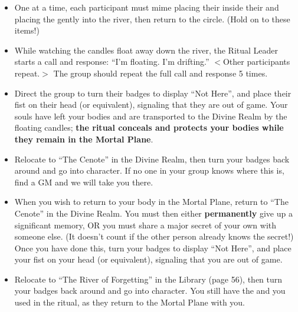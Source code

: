 \documentclass[green]{GL2020}
\begin{document}
\begin{enumerate}
\begin{itemize}
        \item One at a time, each participant must mime placing their \iRitualCandle{} inside their \iGlassVial{} and placing the \iGlassVial{} gently into the river, then return to the circle. (Hold on to these items!)
        \item While watching the candles float away down the river, the Ritual Leader starts a call and response: ``I'm floating. I'm drifting.'' $<$Other participants repeat.$>$ The group should repeat the full call and response 5 times.
        \item Direct the group to turn their badges to display ``Not Here'', and place their fist on their head (or equivalent), signaling that they are out of game. Your souls have left your bodies and are transported to the Divine Realm by the floating candles; \textbf{the ritual conceals and protects your bodies while they remain in the Mortal Plane}.
        \item Relocate to ``The Cenote'' in the Divine Realm, then turn your badges back around and go into character. If no one in your group knows where this is, find a GM and we will take you there.
        \item When you wish to return to your body in the Mortal Plane, return to ``The Cenote'' in the Divine Realm. You must then either \textbf{permanently} give up a significant memory, OR you must share a major secret of your own with someone else. (It doesn't count if the other person already knows the secret!) Once you have done this, turn your badges to display ``Not Here'', and place your fist on your head (or equivalent), signaling that you are out of game. 
       \item Relocate to ``The River of Forgetting'' in the Library (page 56), then turn your badges back around and go into character. You still have the \iRitualCandle{} and \iGlassVial{} you used in the ritual, as they return to the Mortal Plane with you.
    \end{itemize}
\end{enumerate}
\end{document}
